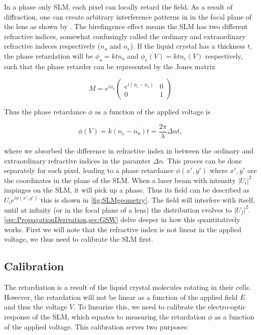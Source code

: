 In a phase only \ac{SLM}, each pixel can locally retard the field. As a result of diffraction, one can create arbitrary interference patterns in in the focal plane of the lens as shown by \cite{Bijnen2013}. The birefingence effect means the \ac{SLM} has two different refractive indices, somewhat confusingly called the ordinary and extraordinary refractive indeces respectively ($n_o$ and $n_e$). If the liquid crystal has a thickness $t$, the phase retardation will be $\phi_o = k t n_o$ and $\phi_e(V) = k t n_e(V)$ respectively, such that the phase retarder can be represented by the Jones matrix \cite{Guzman2017}

\begin{equation}\label{eq:JonesMatrix}
    M = e^{i \phi_0} 
    \begin{pmatrix}
        e^{i(\phi_e-\phi_o)} & 0\\
        0 & 1
    \end{pmatrix}
\end{equation}

Thus the phase retardance $\phi$ as a function of the applied voltage is \cite{Guzman2017}

\begin{equation}
    \phi(V) = k (n_e - n_0) t = \frac{2\pi}{\lambda} \Delta n t,
\end{equation}

where we absorbed the difference in refractive index in between the ordinary and extraordinary refractive indices in the paramter $\Delta n$.
This proces can be done separately for each pixel, leading to a phase retardance $
\phi(x',y')$ where $x',y'$ are the coordinates in the plane of the SLM. When a laser beam with intensity $|U_i|^2$ impinges on the SLM, it will pick up a phase. Thus its field can be described as $U_i e^{i\phi(x',y')}$ this is shown in \cref{fig:SLMgeometry}. The field will interfere with itself, until at infinity (or in the focal plane of a lens) the distribution evolves to $|U_f|^2$. \cref{sec:PropagationDerivation,sec:GSW} delve deeper in how this quantitatively works. First we will note that the refractive index is not linear in the applied voltage, we thus need to calibrate the SLM first. 

\subsection{Calibration}

The retardiation is a result of the liquid crystal molecules rotating in their cells. However, the retardation will not be linear as a function of the applied field $E$ and thus the voltage $V$. To linearize this, we need to calibrate the electro-optic response of the \ac{SLM}, which equates to measuring the retardation $\phi$ as a function of the applied voltage. This calibration serves two purposes:

